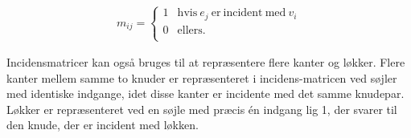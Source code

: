 \begin{align*}
	m_{ij}= \left\{\begin{array}{cc}
	1 & \textrm{hvis} \  {e_j} \  \textrm{er} \  \textrm{incident} \ \textrm{med} \ v_i \\
	0 & \textrm{ellers}. \\
	\end{array}\right.
\end{align*}

Incidensmatricer kan også bruges til at repræsentere flere kanter og løkker.
Flere kanter mellem samme to knuder er repræsenteret i incidens-matricen ved søjler med identiske indgange, idet disse kanter er incidente med det samme knudepar.
Løkker er repræsenteret ved en søjle med præcis én indgang lig 1, der svarer til den knude, der er incident med løkken.


